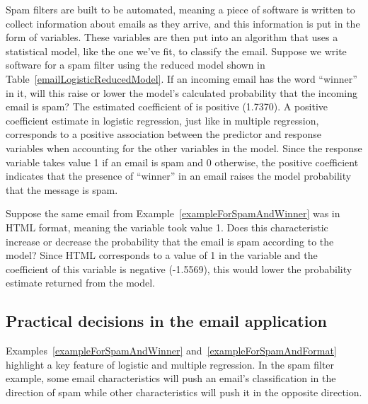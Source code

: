 \begin{example}{Spam filters are built to be automated, meaning a piece of software is written to collect information about emails as they arrive, and this information is put in the form of variables. These variables are then put into an algorithm that uses a statistical model, like the one we've fit, to classify the email. Suppose we write software for a spam filter using the reduced model shown in Table~\ref{emailLogisticReducedModel}. If an incoming email has the word ``winner'' in it, will this raise or lower the model's calculated probability that the incoming email is spam?} \label{exampleForSpamAndWinner}
The estimated coefficient of  is positive (1.7370). A positive coefficient estimate in logistic regression, just like in multiple regression, corresponds to a positive association between the predictor and response variables when accounting for the other variables in the model. Since the response variable takes value 1 if an email is spam and 0 otherwise, the positive coefficient indicates that the presence of ``winner'' in an email raises the model probability that the message is spam.
\end{example}

\begin{example}{Suppose the same email from Example~\ref{exampleForSpamAndWinner} was in HTML format, meaning the  variable took value 1. Does this characteristic increase or decrease the probability that the email is spam according to the model?}\label{exampleForSpamAndFormat}
Since HTML corresponds to a value of 1 in the  variable and the coefficient of this variable is negative (-1.5569), this would lower the probability estimate returned from the model.
\end{example}

\subsection{Practical decisions in the email application}

Examples~\ref{exampleForSpamAndWinner} and~\ref{exampleForSpamAndFormat} highlight a key feature of logistic and multiple regression. In the spam filter example, some email characteristics will push an email's classification in the direction of spam while other characteristics will push it in the opposite direction.

